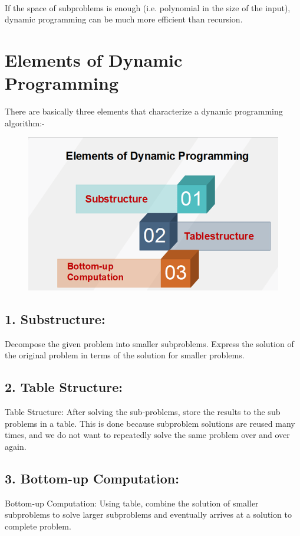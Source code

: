 \documentclass[11pt]{article}
\begin{document}
\paragraph*{}If the space of subproblems is enough (i.e. polynomial in the size of the input), dynamic programming can be much more efficient than recursion.
\section*{Elements of Dynamic Programming}

There are basically three elements that characterize a dynamic programming algorithm:-
\begin{figure}
\includegraphics[width=.8\textwidth]{2.png}
\end{figure}
\subsection*{1. Substructure:}
Decompose the given problem into smaller subproblems. Express the solution of the original problem in terms of the solution for smaller problems.\\
\subsection*{2. Table Structure:}
Table Structure: After solving the sub-problems, store the results to the sub problems in a table. This is done because subproblem solutions are reused many times, and we do not want to repeatedly solve the same problem over and over again.\\
\subsection*{3. Bottom-up Computation:}
Bottom-up Computation: Using table, combine the solution of smaller subproblems to solve larger subproblems and eventually arrives at a solution to complete problem.\\
\end{document}
